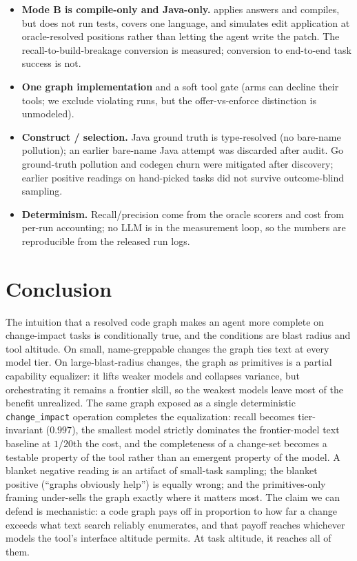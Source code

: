 \documentclass[11pt]{article}
\newcommand{\code}[1]{\texttt{#1}}
\begin{document}
\begin{itemize}[leftmargin=*]
suite rather than a one-time sweep, but its coverage is bounded by the
invariants we thought to encode; further defects in unmeasured resolution
paths cannot be ruled out, though by construction they do not touch the
tasks reported here without moving a ceiling the suite checks.
\item \textbf{Mode B is compile-only and Java-only.}  applies
answers and compiles, but does not run tests, covers one language, and
simulates edit application at oracle-resolved positions rather than letting
the agent write the patch. The recall-to-build-breakage conversion is
measured; conversion to end-to-end task success is not.
\item \textbf{One graph implementation} and a soft tool gate (arms can decline
their tools; we exclude violating runs, but the offer-vs-enforce distinction is
unmodeled).
\item \textbf{Construct / selection.} Java ground truth is type-resolved (no
bare-name pollution); an earlier bare-name Java attempt was discarded after audit.
Go ground-truth pollution and codegen churn were mitigated after discovery; earlier
positive readings on hand-picked tasks did not survive outcome-blind sampling.
\item \textbf{Determinism.} Recall/precision come from the oracle scorers and cost
from per-run accounting; no LLM is in the measurement loop, so the numbers are
reproducible from the released run logs.
\end{itemize}

\section{Conclusion}
\label{sec:conclusion}
The intuition that a resolved code graph makes an agent more complete on
change-impact tasks is conditionally true, and the conditions are blast
radius and tool altitude. On small, name-greppable changes the graph ties text
at every model tier. On large-blast-radius changes, the graph as
primitives is a partial capability equalizer: it lifts weaker models and
collapses variance, but orchestrating it remains a frontier skill, so the
weakest models leave most of the benefit unrealized. The same graph exposed as a
single deterministic \code{change\_impact} operation completes the
equalization: recall becomes tier-invariant ($0.997$), the smallest model
strictly dominates the frontier-model text baseline at $1/20$th the cost, and
the completeness of a change-set becomes a testable property of the tool rather
than an emergent property of the model. A blanket negative reading is an
artifact of small-task sampling; the blanket positive (``graphs obviously
help'') is equally wrong; and the primitives-only framing under-sells the graph
exactly where it matters most. The claim we can defend is mechanistic: a code
graph pays off in proportion to how far a change exceeds what text search
reliably enumerates, and that payoff reaches whichever models the tool's
interface altitude permits. At task altitude, it reaches all of them.
\end{document}
